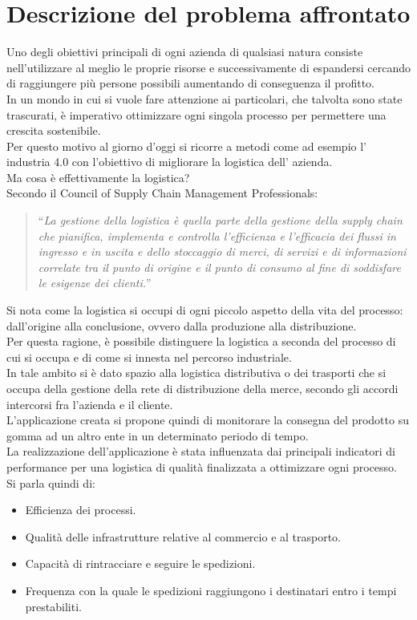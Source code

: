 \documentclass[a4paper,12pt]{report}
\begin{document}
\chapter{Descrizione del problema affrontato}
\label{cap:Descrizione}
Uno degli obiettivi principali di ogni azienda di qualsiasi natura consiste nell'utilizzare al meglio le proprie risorse e successivamente di espandersi cercando di raggiungere più persone possibili
aumentando di conseguenza il profitto. \\
In un mondo in cui si vuole fare attenzione ai particolari, che talvolta sono state trascurati, è imperativo ottimizzare ogni singola processo per permettere una crescita sostenibile.\\
Per questo motivo al giorno d'oggi si ricorre a metodi come ad esempio l' industria 4.0 con l'obiettivo di migliorare la logistica dell' azienda.\\
Ma cosa è effettivamente la logistica?\\Secondo il Council of Supply Chain Management Professionals:
\begin{quote}
``{\em La gestione della logistica è quella parte della gestione della supply chain che pianifica, implementa e controlla l'efficienza e l'efficacia dei flussi in ingresso e in uscita e dello stoccaggio di merci, di servizi e di informazioni correlate tra il punto di origine e il punto di consumo al fine di soddisfare le esigenze dei clienti.}''
\end{quote}
Si nota come la logistica si occupi di ogni piccolo aspetto della vita del processo: dall'origine alla conclusione, ovvero dalla produzione alla distribuzione.\\
Per questa ragione, è possibile distinguere la logistica a seconda del processo di cui si occupa e di come si innesta nel percorso industriale.\\
In tale ambito si è dato spazio alla logistica distributiva o dei trasporti che si occupa della gestione della rete di distribuzione della merce, secondo gli accordi intercorsi fra l'azienda e il cliente.\\
L'applicazione creata si propone quindi di monitorare la consegna del prodotto su gomma ad un altro ente in un determinato periodo di tempo.\\
La realizzazione dell'applicazione è stata influenzata dai principali indicatori di performance per una logistica di qualità finalizzata a ottimizzare ogni processo.\\
Si parla quindi di:
\begin{itemize}
	\item Efficienza dei processi.
	\item Qualità delle infrastrutture relative al commercio e al trasporto.
	\item Capacità di rintracciare e seguire le spedizioni.
	\item Frequenza con la quale le spedizioni raggiungono i destinatari entro i tempi prestabiliti.
\end{itemize}
\end{document}

